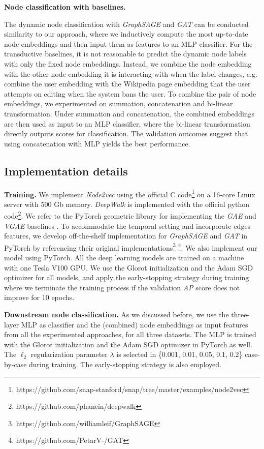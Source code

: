 \documentclass{article} %
\begin{document}
\textbf{Node classification with baselines.}

The dynamic node classification with \textsl{GraphSAGE} and \textsl{GAT} can be conducted similarity to our approach, where we inductively compute the most up-to-date node embeddings and then input them as features to an MLP classifier. For the transductive baselines, it is not reasonable to predict the dynamic node labels with only the fixed node embeddings. Instead, we combine the node embedding with the other node embedding it is interacting with when the label changes, e.g. combine the user embedding with the Wikipedia page embedding that the user attempts on editing when the system bans the user. To combine the pair of node embeddings, we experimented on summation, concatenation and bi-linear transformation. Under summation and concatenation, the combined embeddings are then used as input to an MLP classifier, where the bi-linear transformation directly outputs scores for classification. The validation outcomes suggest that using concatenation with MLP yields the best performance. 

\subsection{Implementation details}

\textbf{Training.}
We implement \textsl{Node2vec} using the official C code\footnote{https://github.com/snap-stanford/snap/tree/master/examples/node2vec} on a 16-core Linux server with 500 Gb memory. \textsl{DeepWalk} is implemented with the official python code\footnote{https://github.com/phanein/deepwalk}. We refer to the PyTorch geometric library for implementing the \textsl{GAE} and \textsl{VGAE} baselines \citep{Fey/Lenssen/2019}. To accommodate the temporal setting and incorporate edges features, we develop off-the-shelf implementation for \textsl{GraphSAGE} and \textsl{GAT} in PyTorch by referencing their original implementations\footnote{https://github.com/williamleif/GraphSAGE}  \footnote{https://github.com/PetarV-/GAT }. We also implement our model using PyTorch. All the deep learning models are trained on a machine with one Tesla V100 GPU. We use the Glorot initialization and the Adam SGD optimizer for all models, and apply the early-stopping strategy during training where we terminate the training process if the validation \emph{AP} score does not improve for 10 epochs.

\textbf{Downstream node classification.}
As we discussed before, we use the three-layer MLP as classifier and the (combined) node embeddings as input features from all the experimented approaches, for all three datasets. The MLP is trained with the Glorot initialization and the Adam SGD optimizer in PyTorch as well. The $\ell_2$ regularization parameter $\lambda$ is selected in \{0.001, 0.01, 0.05, 0.1, 0.2\} case-by-case during training. The early-stopping strategy is also employed.
\end{document}

